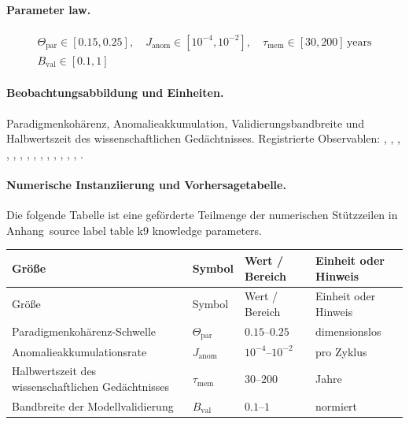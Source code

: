 \paragraph{Parameter law.}
\[
\begin{gathered} \Theta_{\mathrm{par}} \in [0.15,0.25],\quad J_{\mathrm{anom}} \in [10^{-4},10^{-2}],\quad \tau_{\mathrm{mem}} \in [30,200]\,\mathrm{years} \\ B_{\mathrm{val}} \in [0.1,1] \end{gathered}
\]

\paragraph{Beobachtungsabbildung und Einheiten.}
Paradigmenkohärenz, Anomalieakkumulation, Validierungsbandbreite und Halbwertszeit des wissenschaftlichen Gedächtnisses.
Registrierte Observablen: , \allowbreak {}, \allowbreak {}, \allowbreak {}, \allowbreak {}, \allowbreak {}, \allowbreak {}, \allowbreak {}, \allowbreak {}, \allowbreak {}, \allowbreak {}, \allowbreak {}, \allowbreak {}, \allowbreak {}, \allowbreak {}.

\paragraph{Numerische Instanziierung und Vorhersagetabelle.}
Die folgende Tabelle ist eine geförderte Teilmenge der numerischen Stützzeilen in Anhang~source label table k9 knowledge parameters.
\begin{longtable}{@{}L{0.27\textwidth}L{0.15\textwidth}L{0.24\textwidth}L{0.16\textwidth}@{}}
\toprule
Größe & Symbol & Wert / Bereich & Einheit oder Hinweis \\
\midrule
\endfirsthead
\toprule
Größe & Symbol & Wert / Bereich & Einheit oder Hinweis \\
\midrule
\endhead
Paradigmenkohärenz-Schwelle & $\scriptstyle \Theta_{\mathrm{par}}$ & $0.15\text{--}0.25$ & dimensionslos \\
Anomalieakkumulationsrate & $\scriptstyle J_{\mathrm{anom}}$ & $10^{-4}\text{--}10^{-2}$ & pro Zyklus \\
Halbwertszeit des wissenschaftlichen Gedächtnisses & $\scriptstyle \tau_{\mathrm{mem}}$ & $30\text{--}200$ & Jahre \\
Bandbreite der Modellvalidierung & $\scriptstyle B_{\mathrm{val}}$ & $0.1\text{--}1$ & normiert \\
\bottomrule
\end{longtable}

